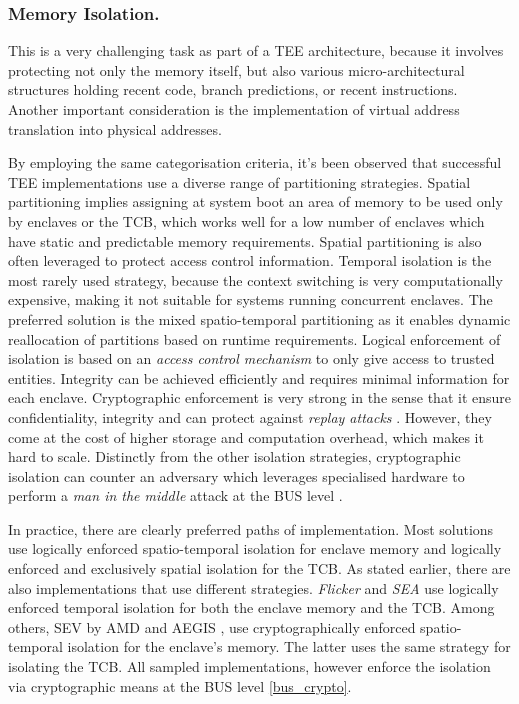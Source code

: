 \documentclass[runningheads,a4paper]{uwsese}
\begin{document}
\subsubsection{Memory Isolation.}

This is a very challenging task as part of a \gls{TEE} architecture, because it
involves protecting not only the memory itself, but also various
micro-architectural structures holding recent code, branch predictions, or
recent instructions. Another important consideration is the implementation of
virtual address translation into physical addresses.

By employing the same categorisation criteria, it's been observed that
successful \gls{TEE} implementations use a diverse range of partitioning
strategies. Spatial partitioning implies assigning at system boot an area of
memory to be used only by enclaves or the \gls{TCB}, which works well for a low
number of enclaves which have static and predictable memory requirements.
Spatial partitioning is also often leveraged to protect access control
information. Temporal isolation is the most rarely used strategy, because the
context switching is very computationally expensive, making it not suitable for
systems running concurrent enclaves. The preferred solution is the mixed
spatio-temporal partitioning as it enables dynamic reallocation of partitions
based on runtime requirements. Logical enforcement of isolation is based on an
\emph{access control mechanism} \label{acc_control} to only give access to
trusted entities. Integrity can be achieved efficiently and requires minimal
information for each enclave. Cryptographic enforcement is very strong in the
sense that it ensure confidentiality, integrity and can protect against
\emph{replay attacks} \cite{tee_replay_attacks}. However, they come at the cost
of higher storage and computation overhead, which makes it hard to scale.
Distinctly from the other isolation strategies, cryptographic isolation can
counter an adversary which leverages specialised hardware to perform a
\emph{man in the middle} attack at the \gls{BUS} level \cite{tee_hw_sup}
\label{bus_crypto}.

In practice, there are clearly preferred paths of implementation. Most
solutions use logically enforced spatio-temporal isolation for enclave memory
and logically enforced and exclusively spatial isolation for the \gls{TCB}. As
stated earlier, there are also implementations that use different strategies.
\emph{Flicker} \cite{flicker} and \emph{SEA} \cite{sea_minimal_tcb} use
logically enforced temporal isolation for both the enclave memory and the
\gls{TCB}. Among others, SEV \cite{amd_sev} by AMD and AEGIS \cite{aegis}, use
cryptographically enforced spatio-temporal isolation for the enclave's memory.
The latter uses the same strategy for isolating the \gls{TCB}. All sampled
implementations, however enforce the isolation via cryptographic means at the
BUS level \ref{bus_crypto}.
\end{document}
